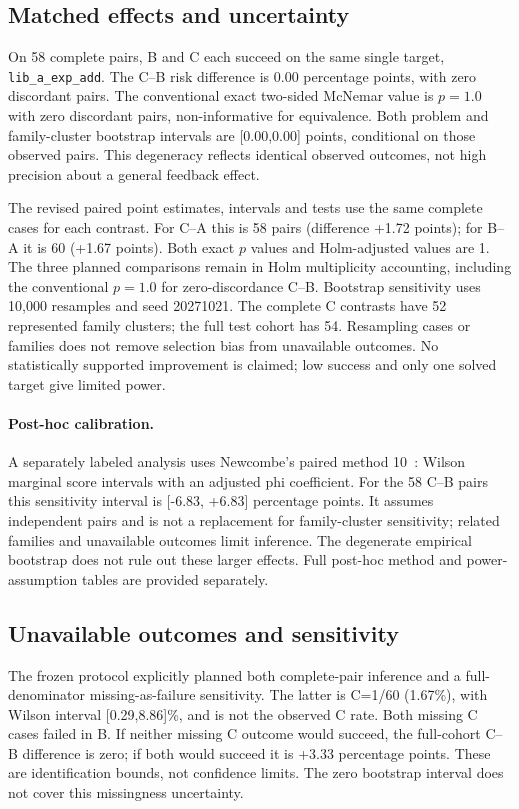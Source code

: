\documentclass[runningheads,a4paper]{llncs}
\begin{document}


\subsection{Matched effects and uncertainty}
On 58 complete pairs, B and C each succeed on the same single target,
\texttt{lib\_a\_exp\_add}. The C--B risk difference is 0.00 percentage points,
with zero discordant pairs. The conventional exact two-sided McNemar value is $p=1.0$ with
zero discordant pairs, non-informative for equivalence. Both problem and family-cluster
bootstrap intervals are [0.00,0.00] points, conditional on those observed pairs.
This degeneracy reflects identical observed outcomes, not high precision about
a general feedback effect.



The revised paired point estimates, intervals and tests use the same complete
cases for each contrast. For C--A this is 58 pairs (difference +1.72 points);
for B--A it is 60 (+1.67 points). Both exact $p$ values and Holm-adjusted values
are 1. The three planned comparisons remain in Holm multiplicity accounting,
including the conventional $p=1.0$ for zero-discordance C--B. Bootstrap sensitivity uses 10,000 resamples and
seed 20271021. The complete C contrasts have 52 represented family clusters;
the full test cohort has 54. Resampling cases or families does not remove
selection bias from unavailable outcomes. No statistically supported improvement
is claimed; low success and only one solved target give limited power.

\paragraph{Post-hoc calibration.} A separately labeled analysis uses Newcombe's paired method 10~\cite{newcombe1998paired}: Wilson marginal score intervals with an adjusted phi coefficient. For the 58 C--B pairs this sensitivity interval is [-6.83, +6.83] percentage points. It assumes independent pairs and is not a replacement for family-cluster sensitivity; related families and unavailable outcomes limit inference. The degenerate empirical bootstrap does not rule out these larger effects. Full post-hoc method and power-assumption tables are provided separately.

\subsection{Unavailable outcomes and sensitivity}
The frozen protocol explicitly planned both complete-pair inference and a
full-denominator missing-as-failure sensitivity. The latter is C=1/60 (1.67\%),
with Wilson interval [0.29,8.86]\%, and is not the observed C rate. Both missing
C cases failed in B. If neither missing C outcome would succeed, the full-cohort
C--B difference is zero; if both would succeed it is +3.33 percentage points.
These are identification bounds, not confidence limits. The zero bootstrap
interval does not cover this missingness uncertainty.
\end{document}
